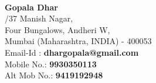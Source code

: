 \documentclass[a4paper,10pt]{article}
\begin{document}
\hspace{0.5cm}\\[-0.2cm]
\Large \textbf{Gopala Dhar} \\         
\normalsize
{}/37 Manish Nagar, \\
\indent Four Bungalows, Andheri W,  \\                                                                                                                                                                                                                                                           
\indent Mumbai (Maharashtra, INDIA) - 400053\\
\indent Email-Id : \textbf{dhargopala@gmail.com} \\
\indent Mobile No.: \textbf{9930350113} \\
\indent Alt Mob No.: \textbf{9419192948} \hfill
{}\\  
\end{document}
